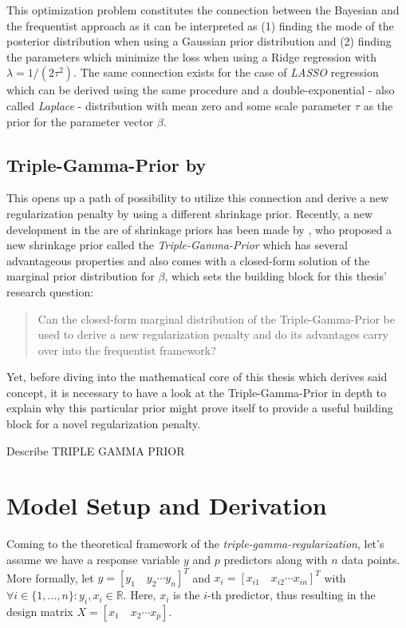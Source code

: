 \documentclass[12pt,a4paper]{article}
\newenvironment{lightbluebox}{%
    \begin{tcolorbox}[colback=lightblue, colframe=lightblue, fontupper=\itshape]%
}{%
    \end{tcolorbox}%
}
\begin{document}
This optimization problem constitutes the connection between the Bayesian and the frequentist approach as it can be interpreted as (1) finding the mode of the posterior distribution when using a Gaussian prior distribution and (2) finding the parameters which minimize the loss when using a Ridge regression with $\lambda = 1/(2\tau^2)$. The same connection exists for the case of \textit{LASSO} regression which can be derived using the same procedure and a double-exponential - also called \textit{Laplace} - distribution with mean zero and some scale parameter $\tau$ as the prior for the parameter vector $\beta$. 

\subsection{Triple-Gamma-Prior by \textcite{TGP2020}}
This opens up a path of possibility to utilize this connection and derive a new regularization penalty by using a different shrinkage prior. Recently, a new development in the are of shrinkage priors has been made by \textcite{TGP2020}, who proposed a new shrinkage prior called the \textit{Triple-Gamma-Prior} which has several advantageous properties and also comes with a closed-form solution of the marginal prior distribution for $\beta$, which sets the building block for this thesis' research question:

\begin{quote}
Can the closed-form marginal distribution of the Triple-Gamma-Prior
be used to derive a new regularization penalty and do its advantages
carry over into the frequentist framework?
\end{quote}

Yet, before diving into the mathematical core of this thesis which derives said concept, it is necessary to have a look at the Triple-Gamma-Prior in depth to explain why this particular prior might prove itself to provide a useful building block for a novel regularization penalty.

\begin{lightbluebox}
Describe TRIPLE GAMMA PRIOR
\end{lightbluebox}


\newpage
\section{Model Setup and Derivation}\label{sec:modelderivation}
Coming to the theoretical framework of the \textit{triple-gamma-regularization}, let's assume we have a response variable $y$ and $p$ predictors along with $n$ data points. More formally, let $y=[y_1  \quad y_2 \cdots y_n]^T$ and $x_i = [x_{i1} \quad x_{i2} \cdots x_{in}]^T$ with $\forall i\in \{1,...,n\}: y_i, x_i \in \mathbb{R}$. Here, $x_i$ is the $i$-th predictor, thus resulting in the design matrix $X = [x_1 \quad x_2 \cdots x_p]$.\\
\end{document}
